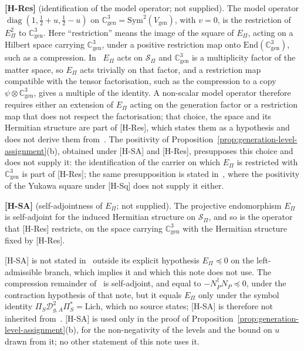 \documentclass[11pt]{article}
\theoremstyle{definition}
\theoremstyle{remark}
\newcommand{\Cgen}{\mathbb{C}^{3}_{\mathrm{gen}}}
\newcommand{\Epi}{E_{\Pi}}
\newcommand{\Sbundle}{\mathcal{S}_{\Pi}}
\newcommand{\Sym}{\mathrm{Sym}}
\newcommand{\diag}{\operatorname{diag}}
\begin{document}
    \medskip
    \noindent\textbf{[H-Res]} (identification of the model operator; not supplied).
    The model operator $\diag(1, \tfrac12 + u, \tfrac12 - u)$ on $\Cgen = \Sym^{2}(V_{\mathrm{gen}})$, with $v = 0$, is
    the
    restriction of $\Epi^{2}$ to $\Cgen$.
    Here ``restriction'' means the image of the square of $\Epi$, acting on a Hilbert space carrying $\Cgen$, under a
    positive restriction map onto $\mathrm{End}(\Cgen)$, such as a compression.
    In~\cite{Beau2026q14} $\Epi$ acts on $\Sbundle$ and $\Cgen$ is a multiplicity factor of the matter space, so
    $\Epi$ acts trivially on that factor, and a restriction map compatible with the tensor factorisation, such as the
    compression to a copy $\psi \otimes \Cgen$, gives a multiple of the identity.
    A non-scalar model operator therefore requires either an extension of $\Epi$ acting on the generation factor or
    a restriction map that does not respect the factorisation; that choice, the space and its Hermitian structure are
    part of [H-Res], which states them as a hypothesis and does not derive them from~\cite{Beau2026q14}.
    The positivity of Proposition~\ref{prop:generation-level-assignment}(b), obtained under [H-SA] and [H-Res],
    presupposes this choice and does not supply it: the identification of the carrier on which $\Epi$ is restricted
    with $\Cgen$ is part of [H-Res]; the same presupposition is stated in~\cite{Beau2026pyo}, where the positivity of
    the Yukawa square under [H-Sq] does not supply it either.
    \medskip

    \noindent\textbf{[H-SA]} (self-adjointness of $\Epi$; not supplied).
    The projective endomorphism $\Epi$ is self-adjoint for the induced Hermitian structure on $\Sbundle$, and so is
    the operator that [H-Res] restricts, on the space carrying $\Cgen$ with the Hermitian structure fixed by [H-Res].
    \medskip

    [H-SA] is not stated in~\cite{Beau2026q14} outside its explicit hypothesis $\Epi \preceq 0$ on the left-admissible
    branch, which implies it and which this note does not use.
    The compression remainder of~\cite{Beau2026prs} is self-adjoint, and equal to $-N_{P}^{\dagger}N_{P} \preceq 0$, under
    the contraction hypothesis of that note, but it equals $\Epi$ only under the symbol identity
    $\Pi_{S}\mathcal{D}_{g,A}^{2}\Pi_{S}^{*} = \mathrm{Lich}$, which no source states; [H-SA] is therefore not inherited
    from~\cite{Beau2026prs}.
    [H-SA] is used only in the proof of Proposition~\ref{prop:generation-level-assignment}(b), for the non-negativity of
    the levels and the bound on $u$ drawn from it; no other statement of this note uses it.
\end{document}
